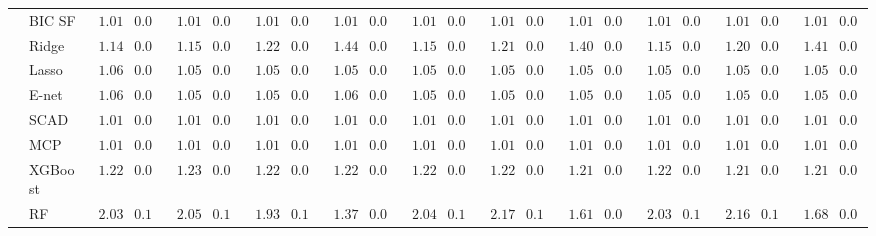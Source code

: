 \begin{tabular}{p{0.2cm}p{1cm}|p{0.6cm}p{0.6cm}|p{0.6cm}p{0.6cm}p{0.6cm}p{0.6cm}p{0.6cm}p{0.6cm}|p{0.6cm}p{0.6cm}p{0.6cm}p{0.6cm}p{0.6cm}p{0.6cm}|p{0.6cm}p{0.6cm}p{0.6cm}p{0.6cm}p{0.6cm}p{0.6cm}}
 & BIC SF  & $\phantom{0}1.01$ & $0.04$ & $\phantom{0}1.01$ & $0.04$ & $\phantom{0}1.01$ & $0.04$ & $\phantom{0}1.01$ & $0.04$ & $\phantom{0}1.01$ & $0.04$ & $\phantom{0}1.01$ & $0.04$ & $\phantom{0}1.01$ & $0.04$ & $\phantom{0}1.01$ & $0.04$ & $\phantom{0}1.01$ & $0.04$ & $\phantom{0}1.01$ & $0.04$ \\
 & Ridge  & $\phantom{0}1.14$ & $0.06$ & $\phantom{0}1.15$ & $0.06$ & $\phantom{0}1.22$ & $0.06$ & $\phantom{0}1.44$ & $0.08$ & $\phantom{0}1.15$ & $0.06$ & $\phantom{0}1.21$ & $0.07$ & $\phantom{0}1.40$ & $0.06$ & $\phantom{0}1.15$ & $0.06$ & $\phantom{0}1.20$ & $0.06$ & $\phantom{0}1.41$ & $0.07$ \\
 & Lasso  & $\phantom{0}1.06$ & $0.05$ & $\phantom{0}1.05$ & $0.05$ & $\phantom{0}1.05$ & $0.05$ & $\phantom{0}1.05$ & $0.05$ & $\phantom{0}1.05$ & $0.05$ & $\phantom{0}1.05$ & $0.05$ & $\phantom{0}1.05$ & $0.05$ & $\phantom{0}1.05$ & $0.05$ & $\phantom{0}1.05$ & $0.05$ & $\phantom{0}1.05$ & $0.05$ \\
 & E-net  & $\phantom{0}1.06$ & $0.05$ & $\phantom{0}1.05$ & $0.05$ & $\phantom{0}1.05$ & $0.05$ & $\phantom{0}1.06$ & $0.05$ & $\phantom{0}1.05$ & $0.05$ & $\phantom{0}1.05$ & $0.05$ & $\phantom{0}1.05$ & $0.05$ & $\phantom{0}1.05$ & $0.05$ & $\phantom{0}1.05$ & $0.05$ & $\phantom{0}1.05$ & $0.05$ \\
 & SCAD  & $\phantom{0}1.01$ & $0.04$ & $\phantom{0}1.01$ & $0.04$ & $\phantom{0}1.01$ & $0.04$ & $\phantom{0}1.01$ & $0.04$ & $\phantom{0}1.01$ & $0.04$ & $\phantom{0}1.01$ & $0.04$ & $\phantom{0}1.01$ & $0.04$ & $\phantom{0}1.01$ & $0.04$ & $\phantom{0}1.01$ & $0.04$ & $\phantom{0}1.01$ & $0.04$ \\
 & MCP  & $\phantom{0}1.01$ & $0.04$ & $\phantom{0}1.01$ & $0.04$ & $\phantom{0}1.01$ & $0.04$ & $\phantom{0}1.01$ & $0.04$ & $\phantom{0}1.01$ & $0.04$ & $\phantom{0}1.01$ & $0.04$ & $\phantom{0}1.01$ & $0.04$ & $\phantom{0}1.01$ & $0.04$ & $\phantom{0}1.01$ & $0.04$ & $\phantom{0}1.01$ & $0.04$ \\
 & XGBoost  & $\phantom{0}1.22$ & $0.07$ & $\phantom{0}1.23$ & $0.06$ & $\phantom{0}1.22$ & $0.06$ & $\phantom{0}1.22$ & $0.06$ & $\phantom{0}1.22$ & $0.06$ & $\phantom{0}1.22$ & $0.05$ & $\phantom{0}1.21$ & $0.06$ & $\phantom{0}1.22$ & $0.06$ & $\phantom{0}1.21$ & $0.06$ & $\phantom{0}1.21$ & $0.06$ \\
 & RF  & $\phantom{0}2.03$ & $0.15$ & $\phantom{0}2.05$ & $0.15$ & $\phantom{0}1.93$ & $0.11$ & $\phantom{0}1.37$ & $0.06$ & $\phantom{0}2.04$ & $0.14$ & $\phantom{0}2.17$ & $0.13$ & $\phantom{0}1.61$ & $0.08$ & $\phantom{0}2.03$ & $0.15$ & $\phantom{0}2.16$ & $0.14$ & $\phantom{0}1.68$ & $0.08$ \\

\end{tabular}
